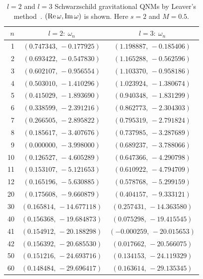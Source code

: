 \begin{table}[ht]
\centering
\caption{$l=2$ and $l=3$ Schwarzschild gravitational QNMs by Leaver's method~\cite{Leaver:1985ax,Leaver:1986gd}.
$(\operatorname{Re}\omega, \operatorname{Im}\omega)$ is shown. Here $s=2$ and $M=0.5$.}
\label{src:2604_20442:tab:leaver_schwarzschild}
\begin{tabular}{rcc}
\toprule
$n$ & $l=2:\ \omega_n$ & $l=3:\ \omega_n$ \\
\midrule
 1 & $( 0.747343,\,-0.177925)$ & $( 1.198887,\,-0.185406)$ \\
 2 & $( 0.693422,\,-0.547830)$ & $( 1.165288,\,-0.562596)$ \\
 3 & $( 0.602107,\,-0.956554)$ & $( 1.103370,\,-0.958186)$ \\
 4 & $( 0.503010,\,-1.410296)$ & $( 1.023924,\,-1.380674)$ \\
 5 & $( 0.415029,\,-1.893690)$ & $( 0.940348,\,-1.831299)$ \\
 6 & $( 0.338599,\,-2.391216)$ & $( 0.862773,\,-2.304303)$ \\
 7 & $( 0.266505,\,-2.895822)$ & $( 0.795319,\,-2.791824)$ \\
 8 & $( 0.185617,\,-3.407676)$ & $( 0.737985,\,-3.287689)$ \\
 9 & $( 0.000000,\,-3.998000)$ & $( 0.689237,\,-3.788066)$ \\
10 & $( 0.126527,\,-4.605289)$ & $( 0.647366,\,-4.290798)$ \\
11 & $( 0.153107,\,-5.121653)$ & $( 0.610922,\,-4.794709)$ \\
12 & $( 0.165196,\,-5.630885)$ & $( 0.578768,\,-5.299159)$ \\
20 & $( 0.175608,\,-9.660879)$ & $( 0.404157,\,-9.333121)$ \\
30 & $( 0.165814,\,-14.677118)$ & $( 0.257431,\,-14.363580)$ \\
40 & $( 0.156368,\,-19.684873)$ & $( 0.075298,\,-19.415545)$ \\
41 & $( 0.154912,\,-20.188298)$ & $(-0.000259,\,-20.015653)$ \\
42 & $( 0.156392,\,-20.685530)$ & $( 0.017662,\,-20.566075)$ \\
50 & $( 0.151216,\,-24.693716)$ & $( 0.134153,\,-24.119329)$ \\
60 & $( 0.148484,\,-29.696417)$ & $( 0.163614,\,-29.135345)$ \\
\bottomrule
\end{tabular}
\end{table}
